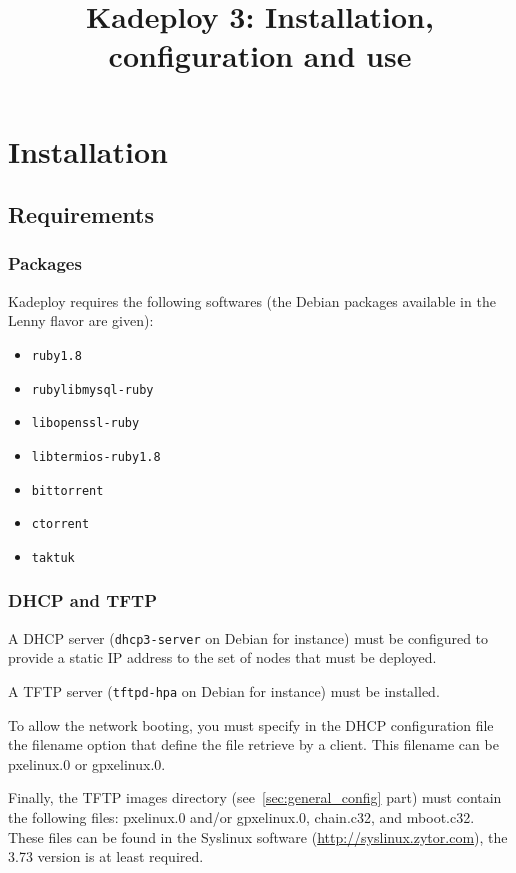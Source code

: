 \documentclass[a4wide,10pt,oneside]{book}
\title{Kadeploy 3: Installation, configuration and use}
\begin{document}
\maketitle

\tableofcontents


\chapter{Installation}
\section{Requirements}
\subsection{Packages}\label{sec:required-packages}
Kadeploy requires the following softwares (the Debian packages available in the Lenny flavor are given):
\begin{itemize}
\item \texttt{ruby1.8}
\item \texttt{rubylibmysql-ruby}
\item \texttt{libopenssl-ruby}
\item \texttt{libtermios-ruby1.8}
\item \texttt{bittorrent}
\item \texttt{ctorrent}
\item \texttt{taktuk}
\end{itemize}

\subsection{DHCP and TFTP}
A DHCP server (\texttt{dhcp3-server} on Debian for instance) must be configured to provide a static IP address to the set of nodes that must be deployed.

A TFTP server (\texttt{tftpd-hpa} on Debian for instance) must be installed.

To allow the network booting, you must specify in the DHCP configuration file the filename option that define the file retrieve by a client. This filename can be pxelinux.0 or gpxelinux.0.

Finally, the TFTP images directory (see~\ref{sec:general_config} part) must contain the following files: pxelinux.0 and/or gpxelinux.0, chain.c32, and mboot.c32. These files can be found in the Syslinux software (\url{http://syslinux.zytor.com}), the 3.73 version is at least required.
\end{document}
